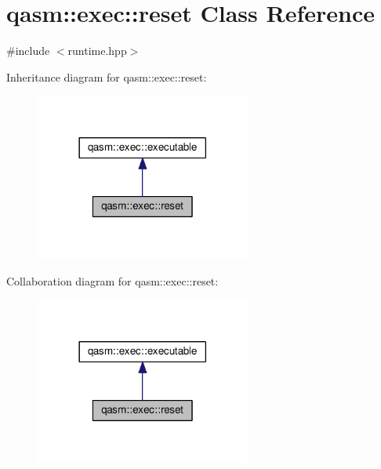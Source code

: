 \hypertarget{classqasm_1_1exec_1_1reset}{}\section{qasm\+:\+:exec\+:\+:reset Class Reference}
\label{classqasm_1_1exec_1_1reset}


{\ttfamily \#include $<$runtime.\+hpp$>$}



Inheritance diagram for qasm\+:\+:exec\+:\+:reset\+:
\nopagebreak
\begin{figure}[H]
\begin{center}
\leavevmode
\includegraphics[width=201pt]{classqasm_1_1exec_1_1reset__inherit__graph}
\end{center}
\end{figure}


Collaboration diagram for qasm\+:\+:exec\+:\+:reset\+:
\nopagebreak
\begin{figure}[H]
\begin{center}
\leavevmode
\includegraphics[width=201pt]{classqasm_1_1exec_1_1reset__coll__graph}
\end{center}
\end{figure}
